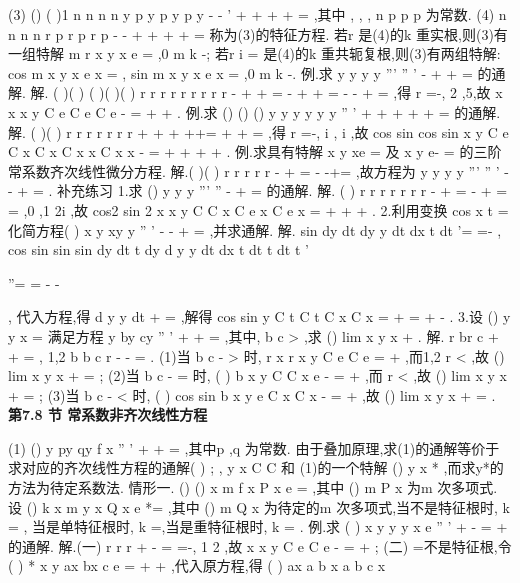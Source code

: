 (3)
()
(
)1
n
n
n
n
y
p y
p
y
p y
-
-
'
+
+
+
+
=
\Lambda 
,其中
,
,
,
n
p
p
p
\Lambda 
为常数. 
(4)
n
n
n
n
r
p r
p
r
p
-
-
+
+
+
+
=
\Lambda 
称为(3)的\textcolor{lyred}{特征方程}. 
若r 是(4)的k 重实根,则(3)有一组特解
m
r x
y
x e
=
,0
m
k
\le 
\le 
-; 
若r
i
\alpha 
\beta 
=
\pm 
是(4)的k 重共轭复根,则(3)有两组特解: 
cos
m
x
y
x e
x
\alpha 
\beta 
=
,
sin
m
x
y
x e
x
\alpha 
\beta 
=
,0
m
k
\le 
\le 
-. 
\textcolor{lyred}{例}.求
y
y
y
y
'''
''
'
-
+
+
=
的通解. 
解.
(
)(
)
(
)(
)(
)
r
r
r
r
r
r
r
r
r
-
+
+
=
\Rightarrow 
-
+
+
=
\Rightarrow 
-
-
+
=
,得 
r =-, 2 ,5,故
x
x
x
y
C e
C e
C e
-
=
+
+
. 
\textcolor{lyred}{例}.求
()
()
()
y
y
y
y
y
y
''
'
+
+
+
+
+
=
的通解. 
解.
(
)(
)
r
r
r
r
r
r
r
+
+
+
++=
\Rightarrow 
+
+
=
,得
r =-, i
\pm , i
\pm ,故 
cos
sin
cos
sin
x
y
C e
C
x
C
x
C x
x
C x
x
-
=
+
+
+
+
. 
\textcolor{lyred}{例}.求具有特解
x
y
xe
=
及
x
y
e-
=
的三阶常系数齐次线性微分方程. 
解.(
)(
)
r
r
r
r
r
-
+
=
\Rightarrow 
-
-+=
,故方程为
y
y
y
y
'''
''
'
-
-
+
=
. 
\textcolor{lyred}{补充练习 }
1.求
()
y
y
y
'''
''
-
+
=
的通解. 
解.
(
)
r
r
r
r
r
r
r
-
+
=
\Rightarrow 
-
+
=
\Rightarrow 
=
,0 ,1
2i
\pm 
,故 
cos2
sin 2
x
x
y
C
C x
C e
x
C e
x
=
+
+
+
. 
2.利用变换
cos
x
t
=
化简方程(
)
x
y
xy
y
''
'
-
-
+
=
,并求通解. 
解.
sin
dy dt
dy
y
dt dx
t dt
'=
=-
,
cos
sin
sin
sin
dy dt
t dy
d y
y
dt dx
t dt
t dt
t
'



''=
=
-
-







, 
代入方程,得
d y
y
dt
+
=
,解得
cos
sin
y
C
t
C
t
C x
C
x
=
+
=
+
-
. 
3.设
()
y
y x
=
满足方程
y
by
cy
''
'
+
+
=
,其中,
b c >
,求
()
lim
x
y x
\to +\infty 
. 
解.
r
br
c
+
+
=
,
1,2
b
b
c
r
-\pm 
-
=
. 
(1)当
b
c
-
>
时,
r x
r x
y
C e
C e
=
+
,而1,2
r
<
,故
()
lim
x
y x
\to +\infty 
=
; 
(2)当
b
c
-
=
时,
(
)
b x
y
C
C x e
-
=
+
,而
r <
,故
()
lim
x
y x
\to +\infty 
=
; 
(3)当
b
c
-
<
时,
(
)
cos
sin
b x
y
e
C
x
C
x
\beta 
\beta 
-
=
+
,故
()
lim
x
y x
\to +\infty 
=
. 
\vspace{6pt}
{\large \bfseries \textcolor{lyred}{第7.8 节 常系数非齐次线性方程}}

(1)
()
y
py
qy
f x
''
'
+
+
=
,其中p ,q 为常数. 
由于叠加原理,求(1)的通解等价于求对应的齐次线性方程的通解(
)
;
,
y x C C
和 
(1)的一个特解
()
y
x
*
,而求y*的方法为\textcolor{lyred}{待定系数法}. 
\textcolor{lyred}{情形一}.
()
()
x
m
f x
P
x e\lambda 
=
,其中
()
m
P
x 为m 次多项式. 
设
()
k
x
m
y
x Q
x e\lambda 
*=
,其中
()
m
Q
x 为待定的m 次多项式,当\lambda 不是特征根时,
k =
, 
当\lambda 是单特征根时,
k =,当\lambda 是重特征根时,
k =
. 
\textcolor{lyred}{例}.求
(
)
x
y
y
y
x
e
''
'
+
-
=
+
的通解. 
解.(一)
r
r
r
+
-
=
\Rightarrow 
=-, 1
2 ,故
x
x
y
C e
C e
-
=
+
; 
(二)
\lambda =不是特征根,令
(
)
*
x
y
ax
bx
c e
=
+
+
,代入原方程,得 
(
)
ax
a
b x
a
b
c
x


